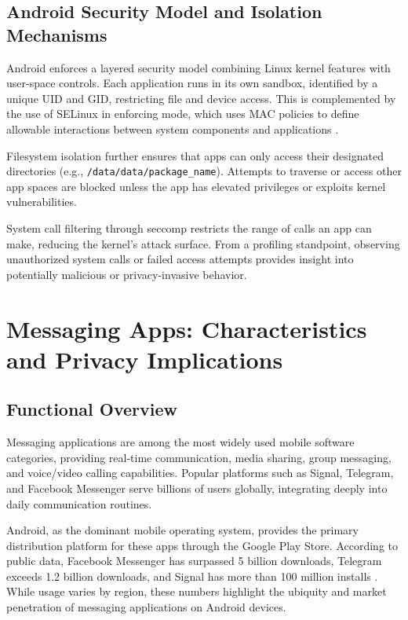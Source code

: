 \documentclass[a4paper,12pt]{report}
\begin{document}
\subsection{Android Security Model and Isolation Mechanisms}
Android enforces a layered security model combining Linux kernel features with user-space controls. Each application runs in its own sandbox, identified by a unique UID and GID, restricting file and device access. This is complemented by the use of SELinux in enforcing mode, which uses MAC policies to define allowable interactions between system components and applications \cite{AOSPSecurity}.

Filesystem isolation further ensures that apps can only access their designated directories (e.g., \texttt{/data/data/{package\_name}}). Attempts to traverse or access other app spaces are blocked unless the app has elevated privileges or exploits kernel vulnerabilities.

System call filtering through seccomp restricts the range of calls an app can make, reducing the kernel's attack surface. From a profiling standpoint, observing unauthorized system calls or failed access attempts provides insight into potentially malicious or privacy-invasive behavior.

\section{Messaging Apps: Characteristics and Privacy Implications}

\subsection{Functional Overview}
Messaging applications are among the most widely used mobile software categories, providing real-time communication, media sharing, group messaging, and voice/video calling capabilities. Popular platforms such as Signal, Telegram, and Facebook Messenger serve billions of users globally, integrating deeply into daily communication routines.

Android, as the dominant mobile operating system, provides the primary distribution platform for these apps through the Google Play Store. According to public data, Facebook Messenger has surpassed 5 billion downloads, Telegram exceeds 1.2 billion downloads, and Signal has more than 100 million installs \cite{StatistaMessenger, StatistaTelegram, StatistaSignal}. While usage varies by region, these numbers highlight the ubiquity and market penetration of messaging applications on Android devices.
\end{document}
